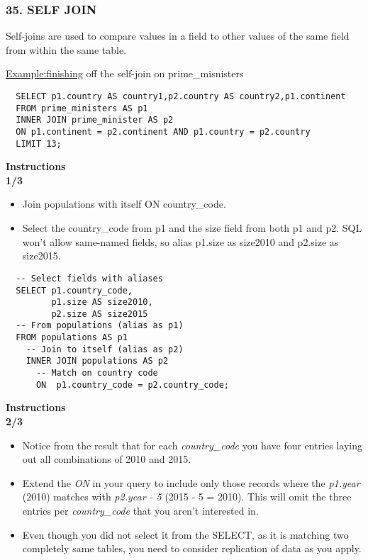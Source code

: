 \documentclass[
]{article}
\providecommand{\tightlist}{%
  \setlength{\itemsep}{0pt}\setlength{\parskip}{0pt}}
\begin{document}
\hypertarget{self-join}{%
\subsubsection{35. SELF JOIN}\label{self-join}}

Self-joins are used to compare values in a field to other values of the
same field from within the same table.

\url{Example:finishing} off the self-join on prime\_misnisters

\begin{verbatim}
  SELECT p1.country AS country1,p2.country AS country2,p1.continent
  FROM prime_ministers AS p1
  INNER JOIN prime_minister AS p2
  ON p1.continent = p2.continent AND p1.country = p2.country
  LIMIT 13;
\end{verbatim}

\textbf{Instructions}\\
\textbf{1/3}

\begin{itemize}
\item
  Join populations with itself ON country\_code.
\item
  Select the country\_code from p1 and the size field from both p1 and
  p2. SQL won't allow same-named fields, so alias p1.size as size2010
  and p2.size as size2015.
\end{itemize}

\begin{verbatim}
  -- Select fields with aliases
  SELECT p1.country_code,
         p1.size AS size2010,
         p2.size AS size2015
  -- From populations (alias as p1)
  FROM populations AS p1
    -- Join to itself (alias as p2)
    INNER JOIN populations AS p2
      -- Match on country code
      ON  p1.country_code = p2.country_code;
\end{verbatim}

\textbf{Instructions}\\
\textbf{2/3}

\begin{itemize}
\tightlist
\item
  Notice from the result that for each \emph{country\_code} you have
  four entries laying out all combinations of 2010 and 2015.
\item
  Extend the \emph{ON} in your query to include only those records where
  the \emph{p1.year} (2010) matches with \emph{p2.year - 5} (2015 - 5 =
  2010). This will omit the three entries per \emph{country\_code} that
  you aren't interested in.
\item
  Even though you did not select it from the SELECT, as it is matching
  two completely same tables, you need to consider replication of data
  as you apply.
\end{itemize}
\end{document}
